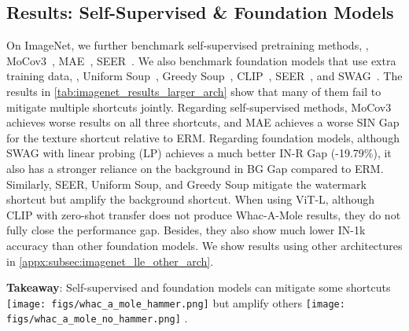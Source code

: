 \documentclass[10pt,twocolumn,letterpaper]{article}
\DeclareRobustCommand{\molehammer}{\begingroup\normalfont
  \texttt{[image: figs/whac\_a\_mole\_hammer.png]}\endgroup
}
\DeclareRobustCommand{\molenohammer}{\begingroup\normalfont
  \texttt{[image: figs/whac\_a\_mole\_no\_hammer.png]}\endgroup
}
\begin{document}
\subsection{Results: Self-Supervised \& Foundation Models}
\label{subsec:self_sup_foundation_results}

On ImageNet, we further benchmark self-supervised pretraining methods, \ie, MoCov3~\cite{chen2021IEEECVFInt.Conf.Comput.Vis.ICCVEmpirical}, MAE~\cite{he2022IEEECVFConf.Comput.Vis.PatternRecognit.CVPRMasked}, SEER~\cite{goyal2022Vision}. We also benchmark foundation models that use extra training data, \ie, Uniform Soup~\cite{wortsman2022Int.Conf.Mach.Learn.Model}, Greedy Soup~\cite{wortsman2022Int.Conf.Mach.Learn.Model}, CLIP~\cite{radford2021Int.Conf.Mach.Learn.Learning}, SEER~\cite{goyal2022Vision}, and SWAG~\cite{singh2022IEEECVFConf.Comput.Vis.PatternRecognit.CVPRRevisiting}.
The results in \cref{tab:imagenet_results_larger_arch} show that many of them fail to mitigate multiple shortcuts jointly.
Regarding self-supervised methods, MoCov3 achieves worse results on all three shortcuts, and MAE achieves a worse SIN Gap for the texture shortcut relative to ERM.
Regarding foundation models, although SWAG with linear probing (LP) achieves a much better IN-R Gap (-19.79\%), it also has a stronger reliance on the background in BG Gap compared to ERM.
Similarly, SEER, Uniform Soup, and Greedy Soup mitigate the watermark shortcut but amplify the background shortcut.
When using ViT-L, although CLIP with zero-shot transfer does not produce Whac-A-Mole results, they do not fully close the performance gap. Besides, they also show much lower IN-1k accuracy than other foundation models. We show results using other architectures in \cref{appx:subsec:imagenet_lle_other_arch}.
\begin{mybox}
    \textbf{Takeaway}: Self-supervised and foundation models can mitigate some shortcuts \molehammer{} but amplify others \molenohammer.
\end{mybox}
\end{document}
